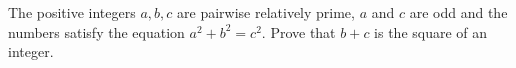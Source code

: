 The positive integers $a,b,c$ are pairwise relatively prime, $a$ and $c$ are odd and the numbers satisfy the equation $a^2+b^2=c^2$. Prove that $b+c$ is the square of an integer.